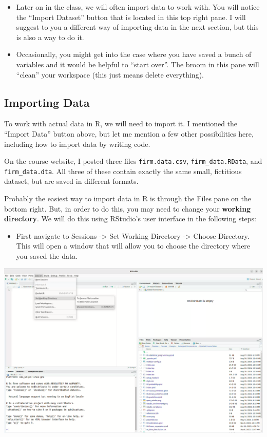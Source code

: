 \documentclass[
  letterpaper,
  DIV=11,
  numbers=noendperiod]{scrreprt}
\providecommand{\tightlist}{%
  \setlength{\itemsep}{0pt}\setlength{\parskip}{0pt}}\usepackage{longtable,booktabs,array}
\begin{document}
\begin{itemize}
\item
  Later on in the class, we will often import data to work with. You
  will notice the ``Import Dataset'' button that is located in this top
  right pane. I will suggest to you a different way of importing data in
  the next section, but this is also a way to do it.
\item
  Occasionally, you might get into the case where you have saved a bunch
  of variables and it would be helpful to ``start over''. The broom in
  this pane will ``clean'' your workspace (this just means delete
  everything).
\end{itemize}

\subsection{Importing Data}\label{importing-data}

To work with actual data in R, we will need to import it. I mentioned
the ``Import Data'' button above, but let me mention a few other
possibilities here, including how to import data by writing code.

On the course website, I posted three files \texttt{firm.data.csv},
\texttt{firm\_data.RData}, and \texttt{firm\_data.dta}. All three of
these contain exactly the same small, fictitious dataset, but are saved
in different formats.

Probably the easiest way to import data in R is through the Files pane
on the bottom right. But, in order to do this, you may need to change
your \textbf{working directory}. We will do this using RStudio's user
interface in the following steps:

\begin{itemize}
\tightlist
\item
  First navigate to Sessions -\textgreater{} Set Working Directory
  -\textgreater{} Choose Directory. This will open a window that will
  allow you to choose the directory where you saved the data.
\end{itemize}

\includegraphics{set_wd.png}
\end{document}
